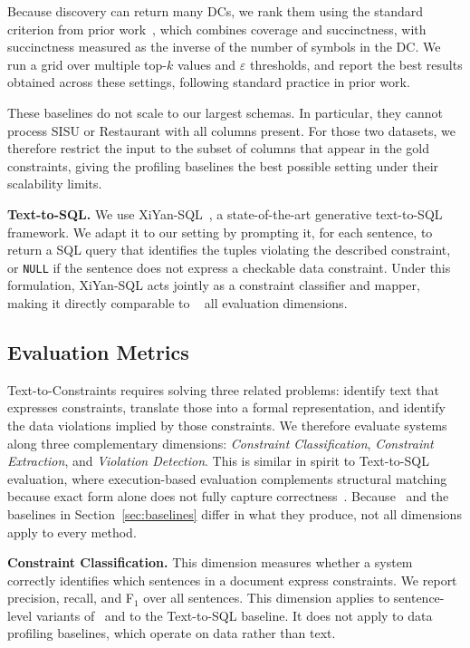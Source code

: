 Because discovery can return many DCs, we rank them using the standard
criterion from prior work~\cite{chu2013discovering}, which combines coverage
and succinctness, with succinctness measured as the inverse of the number of
symbols in the DC. We run a grid over multiple top-$k$ values and
$\varepsilon$ thresholds, and report the best results obtained across these settings, following standard practice in prior work.

These baselines do not scale to our largest schemas. In particular, they
cannot process SISU or Restaurant with all columns present. For those two
datasets, we therefore restrict the input to the subset of columns that appear
in the gold constraints, giving the profiling baselines the best possible
setting under their scalability limits.


\smallskip\noindent\textbf{Text-to-SQL.}
We use XiYan-SQL~\cite{XiYanSQL}, a state-of-the-art generative text-to-SQL
framework. We adapt it to our setting by prompting it, for each sentence, to
return a SQL query that identifies the tuples violating the described
constraint, or \texttt{NULL} if the sentence does not express a checkable data
constraint. Under this formulation, XiYan-SQL acts jointly as a constraint
classifier and mapper, making it directly comparable to \system\  all
evaluation dimensions.


\subsection{Evaluation Metrics}
\label{sec:metrics}

Text-to-Constraints requires solving three related problems: identify
text that expresses constraints, translate those into a formal
representation, and identify the data violations implied by those constraints.
We therefore evaluate systems along three complementary dimensions:
\textit{Constraint Classification}, \textit{Constraint Extraction}, and
\textit{Violation Detection}. This is similar in spirit to Text-to-SQL evaluation, where
execution-based evaluation complements structural matching because exact form
alone does not fully capture correctness~\cite{zhong-etal-2020-semantic}. Because \system\ and the
baselines in Section~\ref{sec:baselines} differ in what they produce, not all
dimensions apply to every method.

\smallskip\noindent\textbf{Constraint Classification.}
This dimension measures whether a system correctly identifies which sentences
in a document express constraints. We report precision, recall, and F$_1$
over all sentences. This dimension applies to sentence-level variants of
\system\ and to the Text-to-SQL baseline. It does not apply to data profiling
baselines, which operate on data rather than text.

